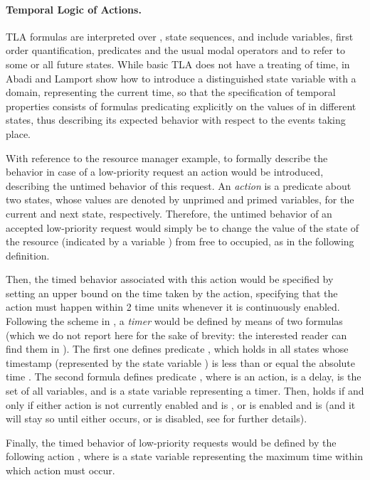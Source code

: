\paragraph{Temporal Logic of Actions.}
TLA formulas are interpreted over ,  state sequences, 
and include variables, first order quantification, predicates 
and the usual modal operators  and  to refer to some 
or all future states. While basic TLA does not have a  
treating of time, in \cite{AL94} Abadi and Lamport show how to introduce 
a distinguished state variable  with a  domain, representing 
the current time, so that the specification of temporal properties 
consists of formulas predicating explicitly on the values of  
in different states, thus describing its expected behavior with 
respect to the events taking place.

With reference to the resource manager example, to formally describe 
the behavior in case of a low-priority request an action  
would be introduced, describing the untimed behavior of this 
request. An \emph{action} is a predicate about two states, whose 
values are denoted by unprimed and primed variables, for the current and 
next state, respectively. Therefore, the untimed behavior of 
an accepted low-priority request would simply be to change the 
value of the state of the resource (indicated by a variable )
from free to occupied, as in the following definition.

Then, the timed behavior associated with this action would be 
specified by setting an upper bound on the time taken by the 
action, specifying that the action must happen within 2 time 
units whenever it is continuously enabled. Following the scheme 
in \cite{AL94}, a \emph{timer} would be defined by means of two formulas 
(which we do not report here for the sake of brevity: the interested 
reader can find them in \cite{AL94}). The first one defines predicate ,
which holds in all states whose timestamp (represented by the 
state variable ) is less than or equal the absolute time .
The second formula defines predicate ,
where  is an action,  is a delay,  is 
the set of all variables, and  is a state variable representing 
a timer. Then,  holds if 
and only if either action  is not currently enabled and 
 is , or  is enabled and  is  
(and it will stay so until either  occurs, or  is disabled, 
see \cite[Sec.~3]{AL94} for further details).

Finally, the timed behavior of low-priority requests would be 
defined by the following action , where  is a state variable representing 
the maximum time within which action  must occur.
  
